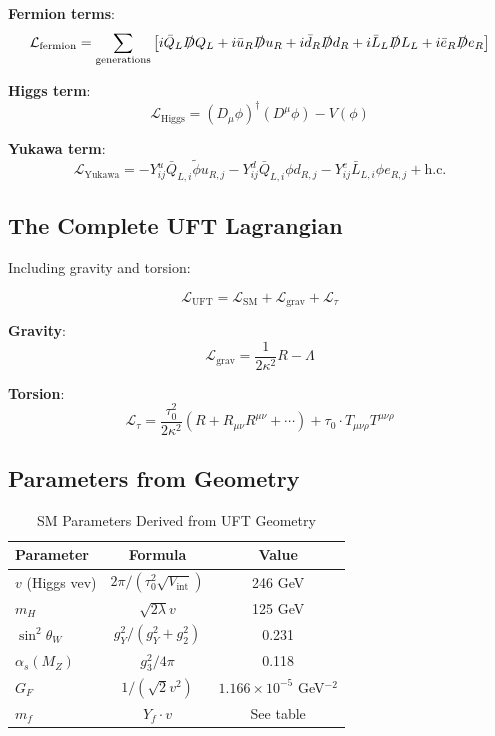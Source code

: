 \textbf{Fermion terms}:
\begin{equation}
    \mathcal{L}_{\text{fermion}} = \sum_{\text{generations}} \left[ i\bar{Q}_L \slashed{D} Q_L + i\bar{u}_R \slashed{D} u_R + i\bar{d}_R \slashed{D} d_R + i\bar{L}_L \slashed{D} L_L + i\bar{e}_R \slashed{D} e_R \right]
\end{equation}

\textbf{Higgs term}:
\begin{equation}
    \mathcal{L}_{\text{Higgs}} = (D_\mu \phi)^\dagger(D^\mu \phi) - V(\phi)
\end{equation}

\textbf{Yukawa term}:
\begin{equation}
    \mathcal{L}_{\text{Yukawa}} = -Y_{ij}^u \bar{Q}_{L,i} \tilde{\phi} u_{R,j} - Y_{ij}^d \bar{Q}_{L,i} \phi d_{R,j} - Y_{ij}^e \bar{L}_{L,i} \phi e_{R,j} + \text{h.c.}
\end{equation}

\subsection{The Complete UFT Lagrangian}

Including gravity and torsion:

\begin{equation}
    \mathcal{L}_{\text{UFT}} = \mathcal{L}_{\text{SM}} + \mathcal{L}_{\text{grav}} + \mathcal{L}_{\tau}
\end{equation}

\textbf{Gravity}:
\begin{equation}
    \mathcal{L}_{\text{grav}} = \frac{1}{2\kappa^2}R - \Lambda
\end{equation}

\textbf{Torsion}:
\begin{equation}
    \mathcal{L}_{\tau} = \frac{\tau_0^2}{2\kappa^2}\left(R + R_{\mu\nu}R^{\mu\nu} + \cdots\right) + \tau_0 \cdot T_{\mu\nu\rho}T^{\mu\nu\rho}
\end{equation}

\subsection{Parameters from Geometry}

\begin{table}[htbp]
\centering
\caption{SM Parameters Derived from UFT Geometry}
\begin{tabular}{@{}lcc@{}}
\toprule
\textbf{Parameter} & \textbf{Formula} & \textbf{Value} \\
\midrule
$v$ (Higgs vev) & $2\pi/(\tau_0^2\sqrt{V_{\text{int}}})$ & 246 GeV \\
$m_H$ & $\sqrt{2\lambda}v$ & 125 GeV \\
$\sin^2\theta_W$ & $g_Y^2/(g_Y^2+g_2^2)$ & 0.231 \\
$\alpha_s(M_Z)$ & $g_3^2/4\pi$ & 0.118 \\
$G_F$ & $1/(\sqrt{2}v^2)$ & $1.166 \times 10^{-5}$ GeV$^{-2}$ \\
$m_f$ & $Y_f \cdot v$ & See table \\
\bottomrule
\end{tabular}
\end{table}

